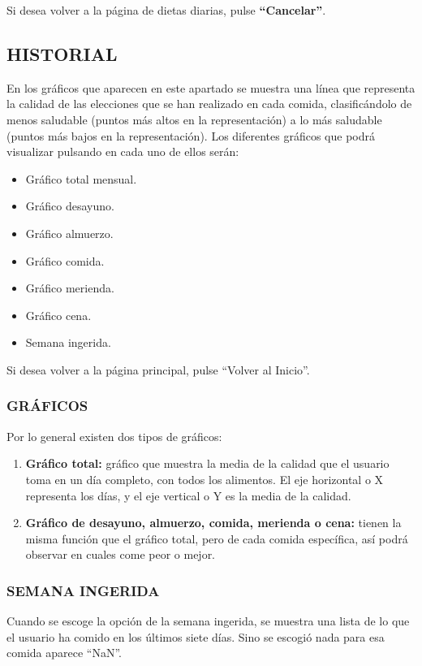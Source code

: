 Si desea volver a la página de dietas diarias, pulse \textbf{“Cancelar”}.

\subsection{HISTORIAL}
En los gráficos que aparecen en este apartado se muestra una línea que representa la calidad de las elecciones que se han realizado en cada comida, clasificándolo de menos saludable (puntos más altos en la representación) a lo más saludable (puntos más bajos en la representación).
Los diferentes gráficos que podrá visualizar pulsando en cada uno de ellos serán:
\begin{itemize}
\item	Gráfico total mensual.
\item	Gráfico desayuno.
\item	Gráfico almuerzo.
\item	Gráfico comida.
\item	Gráfico merienda.
\item	Gráfico cena.
\item	Semana ingerida.
\end{itemize}	

Si desea volver a la página principal, pulse “Volver al Inicio”.
\subsubsection{GRÁFICOS}
Por lo general existen dos tipos de gráficos:
\begin{enumerate}
\item \textbf{Gráfico total:} gráfico que muestra la media de la calidad que el usuario toma en un día completo, con todos los alimentos. El eje horizontal o X representa los días, y el eje vertical o Y es la media de la calidad.
\item \textbf{Gráfico de desayuno, almuerzo, comida, merienda o cena:} tienen la misma función que el gráfico total, pero de cada comida específica, así podrá observar en cuales come peor o mejor.
\end{enumerate}
\subsubsection{SEMANA INGERIDA}
Cuando se escoge la opción de la semana ingerida, se muestra una lista de lo que el usuario ha comido en los últimos siete días. Sino se escogió nada para esa comida aparece “NaN”.